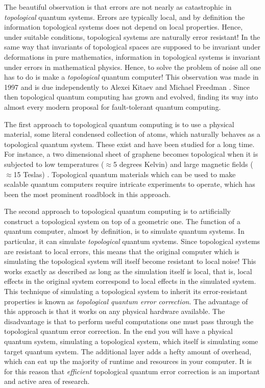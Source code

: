 \documentclass{article}
\theoremstyle{definition}
\numberwithin{figure}{section}
\begin{document}
The beautiful observation is that errors are not nearly as catastrophic in \textit{topological} quantum systems. Errors are typically local, and by definition the information topological systems does not depend on local properties. Hence, under suitable conditions, topological systems are naturally error resistant! In the same way that invariants of topological spaces are supposed to be invariant under deformations in pure mathematics, information in topological systems is invariant under errors in mathematical physics. Hence, to solve the problem of noise all one has to do is make a \textit{topological} quantum computer! This observation was made in 1997 and is due independently to Alexei Kitaev and Michael Freedman \cite{kitaev2003fault, freedman1998p}. Since then topological quantum computing has grown and evolved, finding its way into almost every modern proposal for fault-tolerant quantum computing.

The first approach to topological quantum computing is to use a physical material, some literal condensed collection of atoms, which naturally behaves as a topological quantum system. These exist and have been studied for a long time. For instance, a two dimensional sheet of graphene becomes topological when it is subjected to low temperatures ($\approx$5 degrees Kelvin) and large magnetic fields ($\approx$15 Teslas) \cite{bolotin2009observation}. Topological quantum materials which can be used to make scalable quantum computers require intricate experiments to operate, which has been the most prominent roadblock in this approach.

The second approach to topological quantum computing is to artificially construct a topological system on top of a geometric one. The function of a quantum computer, almost by definition, is to simulate quantum systems. In particular, it can simulate \textit{topological} quantum systems. Since topological systems are resistant to local errors, this means that the original computer which is simulating the topological system will itself become resistant to local noise! This works exactly as described as long as the simulation itself is local, that is, local effects in the original system correspond to local effects in the simulated system. This technique of simulating a topological system to inherit its error-resistant properties is known as \textit{topological quantum error correction}. The advantage of this approach is that it works on any physical hardware available. The disadvantage is that to perform useful computations one must pass through the topological quantum error correction. In the end you will have a physical quantum system, simulating a topological system, which itself is simulating some target quantum system. The additional layer adds a hefty amount of overhead, which can eat up the majority of runtime and resources in your computer. It is for this reason that \textit{efficient} topological quantum error correction is an important and active area of research.
\end{document}
